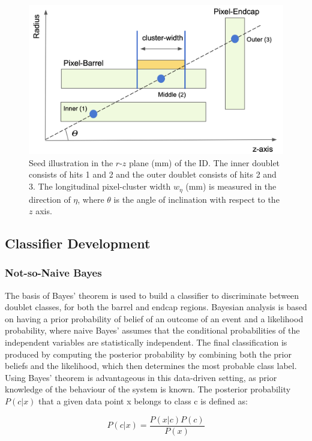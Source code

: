 \begin{figure}[!htbp]
\centering
    \includegraphics[width=0.8\linewidth]{images/4-ml-based-predictor/triplet_illustation.png}
    \caption{Seed illustration in the $r$-$z$ plane (mm) of the ID. The inner doublet consists of hits 1 and 2 and the outer doublet consists of hits 2 and 3. The longitudinal pixel-cluster width $w_{\eta}$ (mm) is measured in the direction of $\eta$, where $\theta$ is the angle of inclination with respect to the $z$ axis.}
\label{fig:triplet-illustration}
\end{figure}


\subsection{Classifier Development}

\subsubsection{Not-so-Naive Bayes}

The basis of Bayes’ theorem \cite{naive-bayes} is used to build a classifier to discriminate between doublet classes, for both the barrel and endcap regions. Bayesian analysis is based on having a prior probability of belief of an outcome of an event and a likelihood probability, where naive Bayes’ assumes that the conditional probabilities of the independent variables are statistically independent. The final classification is produced by computing the posterior probability by combining both the prior beliefs and the likelihood, which then determines the most probable class label. Using Bayes’ theorem is advantageous in this data-driven setting, as prior knowledge of the behaviour of the system is known. The posterior probability $P(c|x)$ that a given data point x belongs to class c is defined as:

\begin{equation} \label{naive-bayes}
    P(c|x) = \frac{P(x|c)P(c)}{P(x)}
\end{equation}

